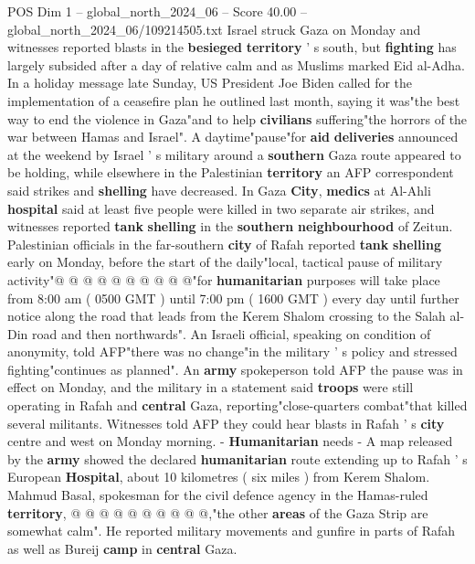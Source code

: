 \begin{textsample}{POS Dim 1 – global\_north\_2024\_06 – Score 40.00 – global\_north\_2024\_06/109214505.txt}  \label{ex:f1_pos_235}
Israel struck Gaza on Monday and witnesses reported blasts in the \textbf{besieged} \textbf{territory} ' s south, but \textbf{fighting} has largely subsided after a day of relative calm and as Muslims marked Eid al-Adha.
In a holiday message late Sunday, US President Joe Biden called for the implementation of a ceasefire plan he outlined last month, saying it was"the best way to end the violence in Gaza"and to help \textbf{civilians} suffering"the horrors of the war between Hamas and Israel".
A daytime"pause"for \textbf{aid} \textbf{deliveries} announced at the weekend by Israel ' s military around a \textbf{southern} Gaza route appeared to be holding, while elsewhere in the Palestinian \textbf{territory} an AFP correspondent said strikes and \textbf{shelling} have decreased.
In Gaza \textbf{City}, \textbf{medics} at Al-Ahli \textbf{hospital} said at least five people were killed in two separate air strikes, and witnesses reported \textbf{tank} \textbf{shelling} in the \textbf{southern} \textbf{neighbourhood} of Zeitun.
Palestinian officials in the far-southern \textbf{city} of Rafah reported \textbf{tank} \textbf{shelling} early on Monday, before the start of the daily"local, tactical pause of military activity"@ @ @ @ @ @ @ @ @ @"for \textbf{humanitarian} purposes will take place from 8:00 am ( 0500 GMT ) until 7:00 pm ( 1600 GMT ) every day until further notice along the road that leads from the Kerem Shalom crossing to the Salah al-Din road and then northwards".
An Israeli official, speaking on condition of anonymity, told AFP"there was no change"in the military ' s policy and stressed fighting"continues as planned".
An \textbf{army} spokeperson told AFP the pause was in effect on Monday, and the military in a statement said \textbf{troops} were still operating in Rafah and \textbf{central} Gaza, reporting"close-quarters combat"that killed several militants.
Witnesses told AFP they could hear blasts in Rafah ' s \textbf{city} centre and west on Monday morning. - \textbf{Humanitarian} needs - A map released by the \textbf{army} showed the declared \textbf{humanitarian} route extending up to Rafah ' s European \textbf{Hospital}, about 10 kilometres ( six miles ) from Kerem Shalom.
Mahmud Basal, spokesman for the civil defence agency in the Hamas-ruled \textbf{territory}, @ @ @ @ @ @ @ @ @ @,"the other \textbf{areas} of the Gaza Strip are somewhat calm".
He reported military movements and gunfire in parts of Rafah as well as Bureij \textbf{camp} in \textbf{central} Gaza.

\end{textsample}
